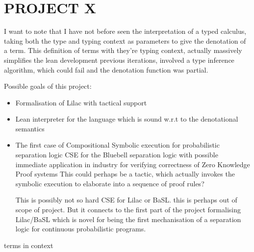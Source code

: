 \chapter{PROJECT X}

I want to note that I have not before seen the interpretation of
a typed calculus, taking both the type and typing context as parameters
to give the denotation of a term. This definition of terms with they're typing
context, actually massively simplifies the lean development
previous iterations, involved a type inference algorithm, which could fail
and the denotation function was partial.

Possible goals of this project:
\begin{itemize}
\item Formalisation of Lilac with tactical support
\item Lean interpreter for the language which is sound w.r.t to the
denotational semantics
\item The first case of Compositional Symbolic execution for probabilistic separation logic
  \subitem CSE for the Bluebell separation logic with possible immediate application in industry
  for verifying correctness of Zero Knowledge Proof systems
  This could perhaps be a tactic, which actually invokes the symbolic execution
  to elaborate into a sequence of proof rules?

  This is possibly not so hard
  \subitem CSE for Lilac or BaSL. this is perhaps out of scope of project. But it
  connects to the first part of the project formalising Lilac/BaSL which is novel
  for being the first mechanisation of a separation logic for continuous probabilistic
  programs.
\end{itemize}

terms in
context